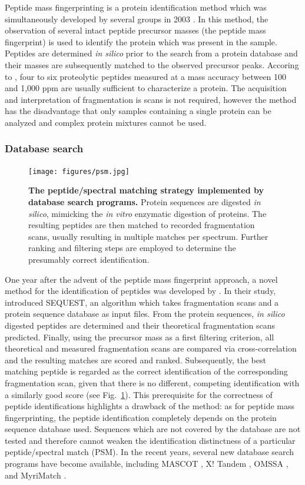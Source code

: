 Peptide mass fingerprinting is a protein identification method which was
simultaneously developed by several groups in 2003 
\citep{Henzel1993,James1993,Mann1993,Pappin1993a,Yates1993}.
In this method, the observation of several intact peptide precursor masses
(the peptide mass fingerprint) is used to identify the protein which was 
present in the sample.
Peptides are determined {\em in silico} prior to the search from a protein
database and their masses are subsequently matched to the observed precursor
peaks.
Accoring to \citet{Mann1993}, four to six proteolytic peptides measured
at a mass accuracy between 100 and 1,000 ppm are usually sufficient to
characterize a protein.
The acquisition and interpretation of fragmentation is scans is not required, 
however the method has the disadvantage that only samples containing a single 
protein can be analyzed and complex protein mixtures cannot be used.

\subsubsection{Database search}

\begin{figure}
\texttt{[image: figures/psm.jpg]}
\caption{
{\bf The peptide/spectral matching strategy implemented by database search 
programs.} 
Protein sequences are digested {\em in silico}, mimicking the {\em in vitro}
enzymatic digestion of proteins. 
The resulting peptides are then matched to recorded fragmentation scans,
usually resulting in multiple matches per spectrum.
Further ranking and filtering steps are employed to determine the presumably
correct identification.
}
\label{fig:psm}
\end{figure}

One year after the advent of the peptide mass fingerprint approach, a novel
method for the identification of peptides was developed by \citet{Eng1994}.
In their study, \citeauthor{Eng1994} introduced SEQUEST, an algorithm which
takes fragmentation scans and a protein sequence database as input files.
From the protein sequences, {\em in silico} digested peptides are determined
and their theoretical fragmentation scans predicted.
Finally, using the precursor mass as a first filtering criterion, all
theoretical and measured fragmentation scans are compared via cross-correlation
and the resulting matches are scored and ranked.
Subsequently, the best matching peptide is regarded as the correct 
identification of the corresponding fragmentation scan, given that there is
no different, competing identification with a similarly good score (see 
Fig.~\ref{fig:psm}).
This prerequisite for the correctness of peptide identifications highlights
a drawback of the method: as for peptide mass fingerprinting, the peptide
identification completely depends on the protein sequence database used.
Sequences which are not covered by the database are not tested and therefore
cannot weaken the identification distinctness of a particular peptide/spectral 
match (PSM).
In the recent years, several new database search programs have become 
available, including MASCOT \citep{Perkins1999}, X! Tandem \citep{Craig2004},
OMSSA \citep{Geer2004}, and MyriMatch \citep{Tabb2007}.

